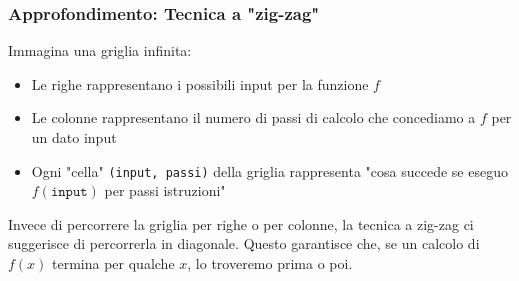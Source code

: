 \documentclass[12pt, a4paper]{report}
\begin{document}
                    \subsubsection{Approfondimento: Tecnica a "zig-zag"}
                        Immagina una griglia infinita:
                        \begin{itemize}
                            \item Le righe rappresentano i possibili input per la funzione $f$
                            \item Le colonne rappresentano il numero di passi di calcolo che concediamo a $f$ per un dato input
                            \item Ogni "cella" \texttt{(input, passi)} della griglia rappresenta "cosa succede se eseguo $f(\texttt{input})$ per passi istruzioni"
                        \end{itemize}
                        Invece di percorrere la griglia per righe o per colonne, la tecnica a zig-zag ci suggerisce di percorrerla in diagonale. Questo garantisce che, se un calcolo di $f(x)$ termina per qualche $x$, lo troveremo prima o poi.
\end{document}
